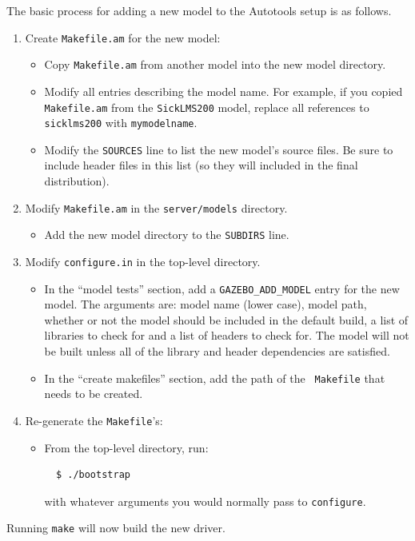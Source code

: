 \documentclass[11pt]{report}
\begin{document}
The basic process for adding a new model to the Autotools setup is as
follows.
\begin{enumerate}
\item Create {\tt Makefile.am} for the new model:
  \begin{itemize}
  \item Copy {\tt Makefile.am} from another model into the new model
  directory.
  \item Modify all entries describing the model name.  For example, if
  you copied {\tt Makefile.am} from the {\tt SickLMS200} model, replace
  all references to {\tt sicklms200} with {\tt mymodelname}.
  \item Modify the {\tt SOURCES} line to list the new model's source files.
  Be sure to include header files in this list (so they will included in the
  final distribution).
  \end{itemize}
\item Modify {\tt Makefile.am} in the {\tt server/models} directory.
  \begin{itemize}
  \item Add the new model directory to the {\tt SUBDIRS} line.
  \end{itemize}
\item Modify {\tt configure.in} in the top-level directory.
  \begin{itemize}
  \item In the ``model tests'' section, add a {\tt GAZEBO\_ADD\_MODEL}
  entry for the new model.  The arguments are: model name (lower
  case), model path, whether or not the model should be included in
  the default build, a list of libraries to check for and a list of
  headers to check for.  The model will not be built unless all of the
  library and header dependencies are satisfied.
  \item In the ``create makefiles'' section, add the path of the {\tt
  Makefile} that needs to be created.
  \end{itemize}
\item Re-generate the {\tt Makefile}'s:
  \begin{itemize}
  \item From the top-level directory, run:
  \begin{verbatim}
  $ ./bootstrap \end{verbatim} %
  with whatever arguments you would normally pass to {\tt configure}.
  \end{itemize}
\end{enumerate}
Running {\tt make} will now build the new driver.
\end{document}
